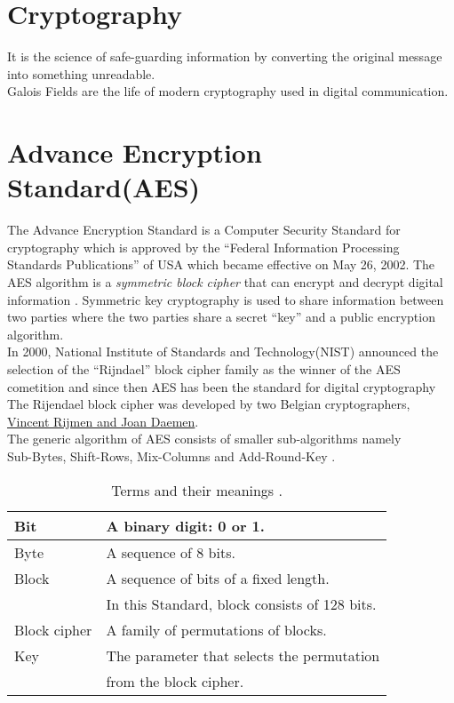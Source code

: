 \section{Cryptography}
It is the science of safe-guarding information by converting the original message into something unreadable.\\
Galois Fields are the life of modern cryptography used in digital communication.

\section{Advance Encryption Standard(AES)}
The Advance Encryption Standard is a Computer Security Standard for cryptography which is approved by the ``Federal Information Processing Standards Publications'' of USA which became effective on May 26, 2002. The AES algorithm is a \textit{symmetric block cipher} that can encrypt and decrypt digital information \cite{aes}. Symmetric key cryptography is used to share information between two parties where the two parties share a secret ``key'' and a public encryption algorithm.\\

In 2000, National Institute of Standards and Technology(NIST) announced the selection of the ``Rijndael'' block cipher family as the winner of the AES cometition and since then AES has been the standard for digital cryptography \cite{aes} The Rijendael block cipher was developed by two Belgian cryptographers, \underline{Vincent Rijmen and Joan Daemen}.\\

The generic algorithm of AES consists of smaller sub-algorithms namely\\ Sub-Bytes, Shift-Rows, Mix-Columns and Add-Round-Key \cite{aes}.

\begin{table}[h!]
  \centering
\begin{tabular}{|l|l|}
  \hline
  Bit & \hspace{7mm}A binary digit: 0 or 1.\\
    \hline
  Byte & \hspace{7mm}A sequence of 8 bits.\\
    \hline
  Block & \hspace{7mm}A sequence of bits of a fixed length.\\
  \ & \hspace{13mm}In this Standard, block consists of 128 bits.\\
    \hline
  Block cipher &  \hspace{7mm}A family of permutations of blocks.\\
    \hline
  Key & \hspace{7mm}The parameter that selects the permutation \\
  \ & \hspace{13mm}from the block cipher.\\
    \hline
\end{tabular}
\caption{Terms and their meanings \cite{aes}.}
\end{table}


